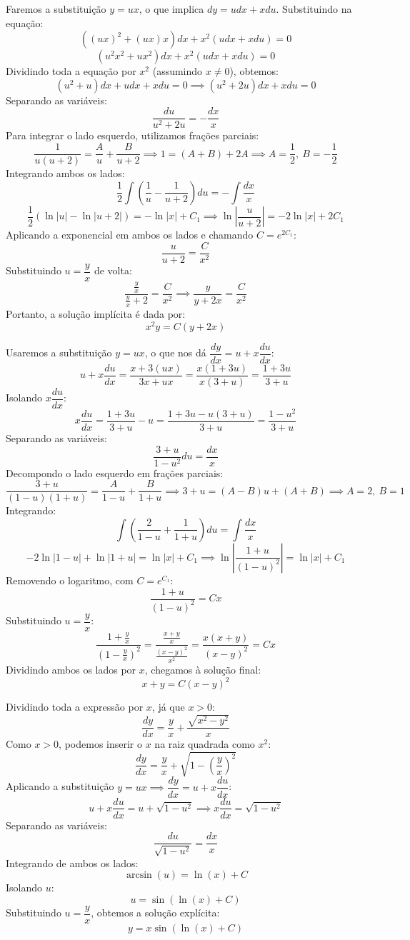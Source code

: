 \documentclass[oneside,12pt,a4paper]{report}
\begin{document}
    \begin{resolucao}
        \itemresolucao Faremos a substituição $y=ux$, o que implica $dy=udx+xdu$. Substituindo na equação:
        \[((ux)^2+(ux)x)dx+x^2(udx+xdu)=0\]
        \[(u^2x^2+ux^2)dx+x^2(udx+xdu)=0\]
        Dividindo toda a equação por $x^2$ (assumindo $x \neq 0$), obtemos:
        \[(u^2+u)dx+udx+xdu=0 \implies (u^2+2u)dx+xdu=0\]
        Separando as variáveis:
        \[\frac{du}{u^2+2u}=-\frac{dx}{x}\]
        Para integrar o lado esquerdo, utilizamos frações parciais:
        \[\frac{1}{u(u+2)}=\frac{A}{u}+\frac{B}{u+2} \implies 1 = (A+B)+2A \implies A=\frac{1}{2},~B=-\frac{1}{2}\]
        Integrando ambos os lados:
        \[\frac{1}{2}\int\left(\frac{1}{u}-\frac{1}{u+2}\right)du=-\int\frac{dx}{x}\]
        \[\frac{1}{2}(\ln|u|-\ln|u+2|)=-\ln|x|+C_1 \implies \ln\left|\frac{u}{u+2}\right|=-2\ln|x|+2C_1\]
        Aplicando a exponencial em ambos os lados e chamando $C=e^{2C_1}$:
        \[\frac{u}{u+2}=\frac{C}{x^2}\]
        Substituindo $u=\dfrac{y}{x}$ de volta:
        \[\frac{\frac{y}{x}}{\frac{y}{x}+2}=\frac{C}{x^2} \implies \frac{y}{y+2x}=\frac{C}{x^2}\]
        Portanto, a solução implícita é dada por:
        \[\boxed{x^2y=C(y+2x)}\]

        \itemresolucao Usaremos a substituição $y=ux$, o que nos dá $\dfrac{dy}{dx}=u+x\dfrac{du}{dx}$:
        \[u+x\frac{du}{dx}=\frac{x+3(ux)}{3x+ux}=\frac{x(1+3u)}{x(3+u)}=\frac{1+3u}{3+u}\]
        Isolando $x\dfrac{du}{dx}$:
        \[x\frac{du}{dx}=\frac{1+3u}{3+u}-u=\frac{1+3u-u(3+u)}{3+u}=\frac{1-u^2}{3+u}\]
        Separando as variáveis:
        \[\frac{3+u}{1-u^2}du=\frac{dx}{x}\]
        Decompondo o lado esquerdo em frações parciais:
        \[\frac{3+u}{(1-u)(1+u)}=\frac{A}{1-u}+\frac{B}{1+u} \implies 3+u=(A-B)u+(A+B) \implies A=2,~B=1\]
        Integrando:
        \[\int\left(\frac{2}{1-u}+\frac{1}{1+u}\right)du=\int\frac{dx}{x}\]
        \[-2\ln|1-u|+\ln|1+u|=\ln|x|+C_1 \implies \ln\left|\frac{1+u}{(1-u)^2}\right|=\ln|x|+C_1\]
        Removendo o logaritmo, com $C=e^{C_1}$:
        \[\frac{1+u}{(1-u)^2}=Cx\]
        Substituindo $u=\dfrac{y}{x}$:
        \[\frac{1+\frac{y}{x}}{\left(1-\frac{y}{x}\right)^2}=\frac{\frac{x+y}{x}}{\frac{(x-y)^2}{x^2}}=\frac{x(x+y)}{(x-y)^2}=Cx\]
        Dividindo ambos os lados por $x$, chegamos à solução final:
        \[\boxed{x+y=C(x-y)^2}\]

        \itemresolucao Dividindo toda a expressão por $x$, já que $x>0$:
        \[\frac{dy}{dx}=\frac{y}{x}+\frac{\sqrt{x^2-y^2}}{x}\]
        Como $x>0$, podemos inserir o $x$ na raiz quadrada como $x^2$:
        \[\frac{dy}{dx}=\frac{y}{x}+\sqrt{1-\left(\frac{y}{x}\right)^2}\]
        Aplicando a substituição $y=ux \implies \dfrac{dy}{dx}=u+x\dfrac{du}{dx}$:
        \[u+x\frac{du}{dx}=u+\sqrt{1-u^2} \implies x\frac{du}{dx}=\sqrt{1-u^2}\]
        Separando as variáveis:
        \[\frac{du}{\sqrt{1-u^2}}=\frac{dx}{x}\]
        Integrando de ambos os lados:
        \[\arcsin(u)=\ln(x)+C\]
        Isolando $u$:
        \[u=\sin(\ln(x)+C)\]
        Substituindo $u=\dfrac{y}{x}$, obtemos a solução explícita:
        \[\boxed{y=x\sin(\ln(x)+C)}\]


\end{resolucao}
\end{document}
